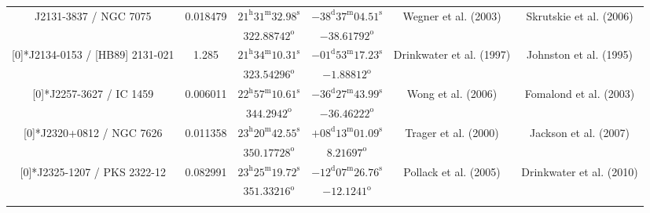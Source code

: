\begin{landscape}
\begin{longtable}{cccccc}
 \multirow{2}[0]{*}{J2131-3837 / NGC 7075} & \multirow{2}[0]{*}{0.018479} &  
    $21^\text{h}31^\text{m}32.98^\text{s}$  & $-38^\text{d}37^\text{m}04.51^\text{s}$  & 
    \multirow{2}[0]{*}{Wegner et al. (2003)\cite{RedRef72_2003}}& \multirow{2}[0]{*}{Skrutskie et al. (2006)\cite{CoordRef77_2006}} \\*
    & & $322.88742^\text{o}$ & $-38.61792^\text{o}$ & & \\ \addlinespace 
 
 \multirow{2}[0]{*}{J2134-0153 / [HB89] 2131-021 } & \multirow{2}[0]{*}{1.285} &  
    $21^\text{h}34^\text{m}10.31^\text{s}$  & $-01^\text{d}53^\text{m}17.23^\text{s}$  & 
    \multirow{2}[0]{*}{Drinkwater et al. (1997)\cite{RedRef79_1997}}& \multirow{2}[0]{*}{Johnston et al. (1995)\cite{CoordRef0_1995}} \\*
    & & $323.54296^\text{o}$ & $-1.88812^\text{o}$ & & \\ \addlinespace 
 

 \multirow{2}[0]{*}{J2257-3627 / IC 1459} & \multirow{2}[0]{*}{0.006011} &  
    $22^\text{h}57^\text{m}10.61^\text{s}$  & $-36^\text{d}27^\text{m}43.99^\text{s}$  & 
     \multirow{2}[0]{*}{Wong et al. (2006)\cite{RedRef69_2006}}& \multirow{2}[0]{*}{Fomalond et al. (2003) \cite{CoordRef25_2003}} \\*
    & & $344.2942^\text{o}$ & $-36.46222^\text{o}$ & & \\ \addlinespace 

 \multirow{2}[0]{*}{J2320+0812 / NGC 7626} & \multirow{2}[0]{*}{0.011358} &  
    $23^\text{h}20^\text{m}42.55^\text{s}$  & $+08^\text{d}13^\text{m}01.09^\text{s}$  & 
    \multirow{2}[0]{*}{Trager et al. (2000) \cite{RedRef3_2000}}& \multirow{2}[0]{*}{Jackson et al. (2007)\cite{CoordRef83_2007}} \\*
    & & $350.17728^\text{o}$ & $8.21697^\text{o}$ & & \\ \addlinespace 

 

\multirow{2}[0]{*}{J2325-1207 / PKS 2322-12} & \multirow{2}[0]{*}{0.082991} &  
    $23^\text{h}25^\text{m}19.72^\text{s}$  & $-12^\text{d}07^\text{m}26.76^\text{s}$  & 
    \multirow{2}[0]{*}{Pollack et al. (2005)\cite{RedRef85_2005}}& \multirow{2}[0]{*}{Drinkwater et al. (2010)\cite{CoordRef85_2010}} \\*
    & & $351.33216^\text{o}$ & $-12.1241^\text{o}$ & & \\ \addlinespace 


\end{longtable}
\end{landscape}
